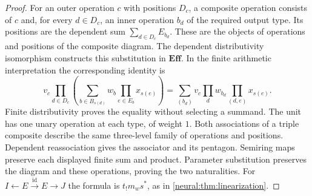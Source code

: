 \documentclass[11pt,a4paper]{article}
\theoremstyle{definition}
\theoremstyle{remark}\newaliascnt{remark}{theorem}
\newcommand{\E}{\mathbf{Eff}}
\newcommand{\id}{\mathrm{id}}
\numberwithin{equation}{section}
\begin{document}
\begin{proof}
For an outer operation $c$ with positions $D_c$, a composite operation
consists of $c$ and, for every $d\in D_c$, an inner operation
$b_d$ of the required output type. Its positions are the dependent
sum $\sum_{d\in D_c}E_{b_d}$. These are the objects of operations and
positions of the composite diagram. The dependent distributivity
isomorphism constructs this substitution in $\E$. In the finite
arithmetic interpretation the corresponding identity is
\[
 v_c\prod_{d\in D_c}
       \left(\sum_{b\in B_{s(d)}}w_b\prod_{e\in E_b}x_{s(e)}\right)
 =\sum_{(b_d)}v_c\prod_dw_{b_d}
                  \prod_{(d,e)}x_{s(e)}.
\]
Finite distributivity proves the equality without selecting a summand.
The unit has one unary operation at each type, of weight $1$.
Both associations of a triple composite describe the same three-level
family of operations and positions. Dependent reassociation gives the
associator and its pentagon. Semiring maps preserve each displayed
finite sum and product. Parameter substitution preserves the diagram
and these operations, proving the two naturalities. For
$I\leftarrow E\xrightarrow{\id}E\to J$ the formula is
$t_!m_ws^*$, as in \cref{neural:thm:linearization}.
\end{proof}
\end{document}
